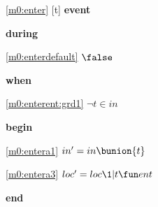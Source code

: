 \noindent \ref{m0:enter} [t] \textbf{event}
\begin{block}
\item \textbf{during}
\begin{block}
\item[ \eqref{m0:enterdefault} ]$\false$ %
\end{block}
\item \textbf{when}
\begin{block}
\item[ \eqref{m0:enterent:grd1} ]$\neg t \in in $ %
\end{block}
\item \textbf{begin}
\begin{block}
\item[ \eqref{m0:entera1} ]$in' = in \bunion \{ t \} $ %
\item[ \eqref{m0:entera3} ]$loc' = loc \1| t \fun ent $ %
\end{block}
\item \textbf{end} \\
\end{block}
